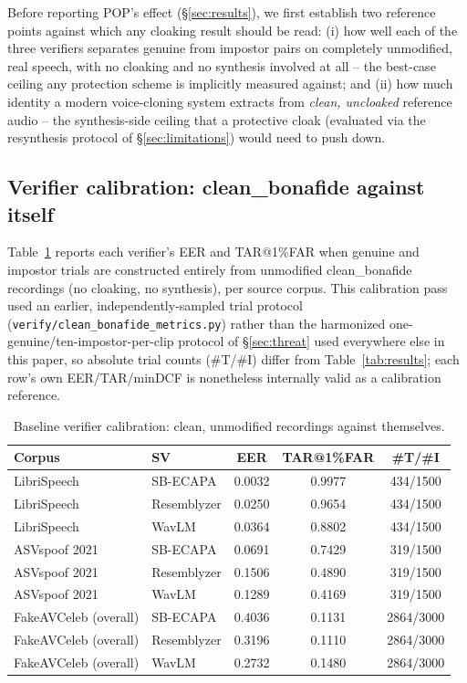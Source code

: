 \documentclass[11pt]{article}
\begin{document}
Before reporting POP's effect (\S\ref{sec:results}), we first establish
two reference points against which any cloaking result should be read:
(i) how well each of the three verifiers separates genuine from
impostor pairs on completely unmodified, real speech, with no cloaking
and no synthesis involved at all -- the best-case ceiling any
protection scheme is implicitly measured against; and (ii) how much
identity a modern voice-cloning system extracts from \emph{clean,
uncloaked} reference audio -- the synthesis-side ceiling that a
protective cloak (evaluated via the resynthesis protocol of
\S\ref{sec:limitations}) would need to push down.

\subsection{Verifier calibration: clean\_bonafide against itself}
\label{sec:calibration}
Table~\ref{tab:calibration} reports each verifier's EER and TAR@1\%FAR
when genuine and impostor trials are constructed entirely from
unmodified clean\_bonafide recordings (no cloaking, no synthesis),
per source corpus. This calibration pass used an earlier,
independently-sampled trial protocol (\texttt{verify/clean\_bonafide\_metrics.py})
rather than the harmonized one-genuine/ten-impostor-per-clip protocol
of \S\ref{sec:threat} used everywhere else in this paper, so absolute
trial counts (\#T/\#I) differ from Table~\ref{tab:results}; each row's
own EER/TAR/minDCF is nonetheless internally valid as a calibration
reference.

\begin{table}[H]
\centering
\caption{Baseline verifier calibration: clean, unmodified recordings against themselves.}
\label{tab:calibration}
\begin{tabular}{llccc}
\toprule
Corpus & SV & EER & TAR@1\%FAR & \#T/\#I \\
\midrule
LibriSpeech    & SB-ECAPA    & 0.0032 & 0.9977 & 434/1500 \\
LibriSpeech    & Resemblyzer & 0.0250 & 0.9654 & 434/1500 \\
LibriSpeech    & WavLM       & 0.0364 & 0.8802 & 434/1500 \\
\addlinespace
ASVspoof 2021  & SB-ECAPA    & 0.0691 & 0.7429 & 319/1500 \\
ASVspoof 2021  & Resemblyzer & 0.1506 & 0.4890 & 319/1500 \\
ASVspoof 2021  & WavLM       & 0.1289 & 0.4169 & 319/1500 \\
\addlinespace
FakeAVCeleb (overall) & SB-ECAPA    & 0.4036 & 0.1131 & 2864/3000 \\
FakeAVCeleb (overall) & Resemblyzer & 0.3196 & 0.1110 & 2864/3000 \\
FakeAVCeleb (overall) & WavLM       & 0.2732 & 0.1480 & 2864/3000 \\
\bottomrule
\end{tabular}
\end{table}
\end{document}
